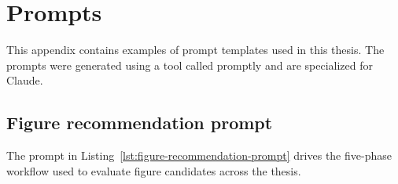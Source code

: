 \section{Prompts}
\label{appendix:prompts}
This appendix contains examples of prompt templates used in this thesis. The prompts were generated using a tool called promptly and are specialized for Claude. 

\subsection{Figure recommendation prompt}
\label{appendix:prompts:figure-recommendation-prompt}

The prompt in Listing~\ref{lst:figure-recommendation-prompt} drives the five-phase workflow used to evaluate figure candidates across the thesis.

